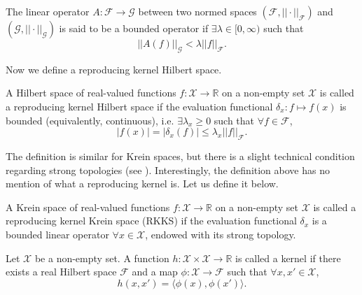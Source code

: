 \begin{definition}
	The linear operator $A:\mathcal F \rightarrow \mathcal G$ between two normed spaces $(\mathcal F, ||\cdot||_{\mathcal F})$ and $(\mathcal G, ||\cdot||_{\mathcal G})$ is said to be a bounded operator if $\exists \lambda \in [0,\infty)$ such that
	$$
	||A(f)||_{\mathcal G} < \lambda||f||_{\mathcal F}.
	$$
\end{definition}

Now we define a reproducing kernel Hilbert space.

\begin{definition}\label{def:rkhs}
	A Hilbert space of real-valued functions $f:\mathcal X \rightarrow \mathbb R$ on a non-empty set $\mathcal X$ is called a reproducing kernel Hilbert space if the evaluation functional $\delta_x: f \mapsto f(x)$ is bounded (equivalently, continuous\footnotemark), i.e. $\exists \lambda_x \geq 0$ such that $\forall f \in \mathcal F$,
	\[
		|f(x)| = |\delta_x(f)| \leq \lambda_x||f||_{\mathcal F}.
	\]
\end{definition}


The definition is similar for Krein spaces, but there is a slight technical condition regarding strong topologies (see \citeauthor{Ong2004}). 
Interestingly, the definition above has no mention of what a reproducing kernel is. Let us define it below. 

\begin{definition}
	A Krein space of real-valued functions $f:\mathcal X \rightarrow \mathbb R$ on a non-empty set $\mathcal X$ is called a reproducing kernel Krein space (RKKS) if the evaluation functional $\delta_x$ is a bounded linear operator $\forall x \in \mathcal X$, endowed with its strong topology.
\end{definition}

\begin{definition}[Kernels]
	Let $\mathcal X$ be a non-empty set. A function $h:\mathcal X\times\mathcal X\rightarrow\mathbb R$ is called a kernel if there exists a real Hilbert space $\mathcal F$ and a map $\phi:\mathcal X \rightarrow \mathcal F$ such that $\forall x,x' \in \mathcal X$,
$$
h(x,x') = \langle \phi(x), \phi(x') \rangle.
$$
\end{definition}

